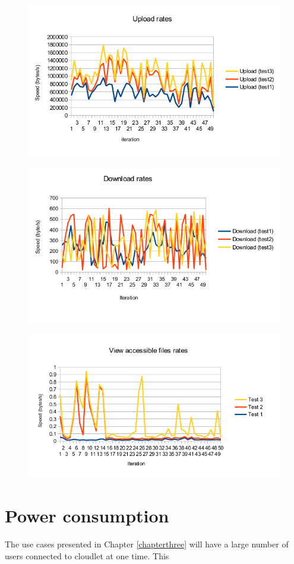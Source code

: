 \begin{figure}[!h]
\centering
\includegraphics[scale=0.9]{figures/transferrates}
\caption{}
\end{figure}

\begin{figure}
\centering
\includegraphics[scale=0.9]{figures/downloadrates}
\caption{}
\end{figure}

\begin{figure}
\centering
\includegraphics[scale=0.9]{figures/viewaccessiblefiles}
\end{figure}

\section{Power consumption}
The use cases presented in Chapter \ref{chapterthree} will have a large number of users connected to cloudlet at one time. This 